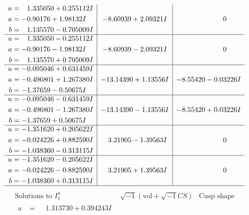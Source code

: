 \documentclass[1p]{elsarticle_modified}
\theoremstyle{definition}
\newcommand{\I}{\sqrt{-1}}
\begin{document}
$$\begin{array}{c|c|c}
\begin{aligned}
u &= \phantom{-}1.335050 + 0.255112 I \\
a &= -0.90176 + 1.98132 I \\
b &= \phantom{-}1.135570 - 0.705009 I\end{aligned}
 & -8.60939 + 2.09321 I & \phantom{-0.000000 } 0 \\ \hline\begin{aligned}
u &= \phantom{-}1.335050 - 0.255112 I \\
a &= -0.90176 - 1.98132 I \\
b &= \phantom{-}1.135570 + 0.705009 I\end{aligned}
 & -8.60939 - 2.09321 I & \phantom{-0.000000 } 0 \\ \hline\begin{aligned}
u &= -0.095046 + 0.631459 I \\
a &= -0.496801 + 1.267380 I \\
b &= -1.37659 - 0.50675 I\end{aligned}
 & -13.14390 + 1.13556 I & -8.55420 - 0.03226 I \\ \hline\begin{aligned}
u &= -0.095046 - 0.631459 I \\
a &= -0.496801 - 1.267380 I \\
b &= -1.37659 + 0.50675 I\end{aligned}
 & -13.14390 - 1.13556 I & -8.55420 + 0.03226 I \\ \hline\begin{aligned}
u &= -1.351620 + 0.205622 I \\
a &= -0.024226 + 0.882590 I \\
b &= -1.038360 - 0.313115 I\end{aligned}
 & \phantom{-}3.21905 - 1.39563 I & \phantom{-0.000000 } 0 \\ \hline\begin{aligned}
u &= -1.351620 - 0.205622 I \\
a &= -0.024226 - 0.882590 I \\
b &= -1.038360 + 0.313115 I\end{aligned}
 & \phantom{-}3.21905 + 1.39563 I & \phantom{-0.000000 } 0\\
 \hline 
 \end{array}$$\newpage$$\begin{array}{c|c|c}  
\text{Solutions to }I^u_{1}& \I (\text{vol} + \sqrt{-1}CS) & \text{Cusp shape}\\
 \hline 
\begin{aligned}
u &= \phantom{-}1.313730 + 0.394243 I \\

\end{aligned}
\end{array}$$
\end{document}
